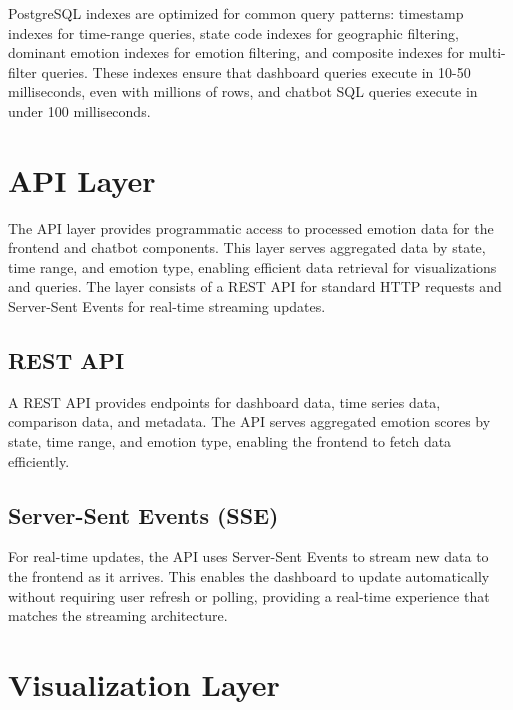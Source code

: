 PostgreSQL indexes are optimized for common query patterns: timestamp indexes for time-range queries, state code indexes for geographic filtering, dominant emotion indexes for emotion filtering, and composite indexes for multi-filter queries. These indexes ensure that dashboard queries execute in 10-50 milliseconds, even with millions of rows, and chatbot SQL queries execute in under 100 milliseconds.


\section{API Layer}

The API layer provides programmatic access to processed emotion data for the frontend and chatbot components. This layer serves aggregated data by state, time range, and emotion type, enabling efficient data retrieval for visualizations and queries. The layer consists of a REST API for standard HTTP requests and Server-Sent Events for real-time streaming updates.

\subsection{REST API}

A REST API provides endpoints for dashboard data, time series data, comparison data, and metadata. The API serves aggregated emotion scores by state, time range, and emotion type, enabling the frontend to fetch data efficiently.

\subsection{Server-Sent Events (SSE)}

For real-time updates, the API uses Server-Sent Events to stream new data to the frontend as it arrives. This enables the dashboard to update automatically without requiring user refresh or polling, providing a real-time experience that matches the streaming architecture.


\section{Visualization Layer}

